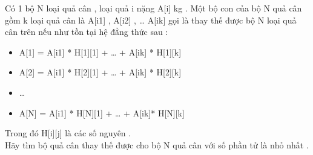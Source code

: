 Có 1 bộ N loại quả cân , loại quả i nặng A[i] kg . Một bộ con của bộ N quả cân gồm k loại quả cân là A[i1] , A[i2] , … A[ik] gọi là thay thế được bộ N loại quả cân trên nếu như tồn tại hệ đẳng thức sau :
\begin{itemize}
	\item A[1] = A[i1] * H[1][1] + … + A[ik] * H[1][k]
	\item A[2] = A[i1] * H[2][1] + … + A[ik] * H[2][k]
	\item …
	\item A[N] = A[i1] * H[N][1] + … + A[ik]* H[N][k]
\end{itemize}

Trong đó H[i][j] là các số nguyên .
\\Hãy tìm bộ quả cân thay thế được cho bộ N quả cân với số phần tử là nhỏ nhất .